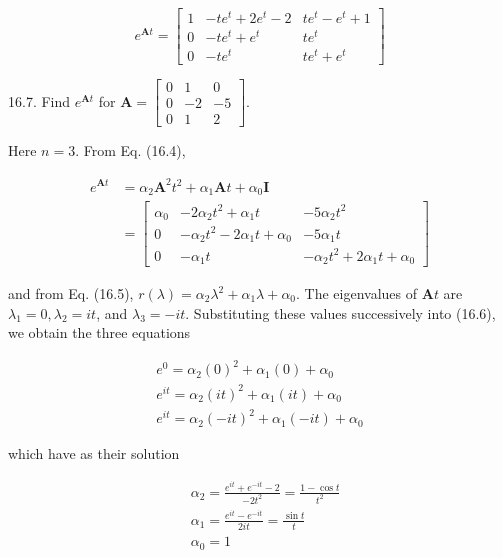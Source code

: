 \documentclass[10pt]{article}
\begin{document}
$$
e^{\mathbf{A} t}=\left[\begin{array}{ccc}
1 & -t e^{t}+2 e^{t}-2 & t e^{t}-e^{t}+1 \\
0 & -t e^{t}+e^{t} & t e^{t} \\
0 & -t e^{t} & t e^{t}+e^{t}
\end{array}\right]
$$

16.7. Find $e^{\mathbf{A} t}$ for $\mathbf{A}=\left[\begin{array}{rrr}0 & 1 & 0 \\ 0 & -2 & -5 \\ 0 & 1 & 2\end{array}\right]$.

Here $n=3$. From Eq. (16.4),


\begin{align*}
e^{\mathbf{A} t} & =\alpha_{2} \mathbf{A}^{2} t^{2}+\alpha_{1} \mathbf{A} t+\alpha_{0} \mathbf{I} \\
& =\left[\begin{array}{ccc}
\alpha_{0} & -2 \alpha_{2} t^{2}+\alpha_{1} t & -5 \alpha_{2} t^{2} \\
0 & -\alpha_{2} t^{2}-2 \alpha_{1} t+\alpha_{0} & -5 \alpha_{1} t \\
0 & -\alpha_{1} t & -\alpha_{2} t^{2}+2 \alpha_{1} t+\alpha_{0}
\end{array}\right] \tag{1}
\end{align*}


and from Eq. (16.5), $r(\lambda)=\alpha_{2} \lambda^{2}+\alpha_{1} \lambda+\alpha_{0}$. The eigenvalues of $\mathbf{A} t$ are $\lambda_{1}=0, \lambda_{2}=i t$, and $\lambda_{3}=-i t$. Substituting these values successively into (16.6), we obtain the three equations

$$
\begin{gathered}
e^{0}=\alpha_{2}(0)^{2}+\alpha_{1}(0)+\alpha_{0} \\
e^{i t}=\alpha_{2}(i t)^{2}+\alpha_{1}(i t)+\alpha_{0} \\
e^{i t}=\alpha_{2}(-i t)^{2}+\alpha_{1}(-i t)+\alpha_{0}
\end{gathered}
$$

which have as their solution

$$
\begin{aligned}
& \alpha_{2}=\frac{e^{i t}+e^{-i t}-2}{-2 t^{2}}=\frac{1-\cos t}{t^{2}} \\
& \alpha_{1}=\frac{e^{i t}-e^{-i t}}{2 i t}=\frac{\sin t}{t} \\
& \alpha_{0}=1
\end{aligned}
$$
\end{document}
